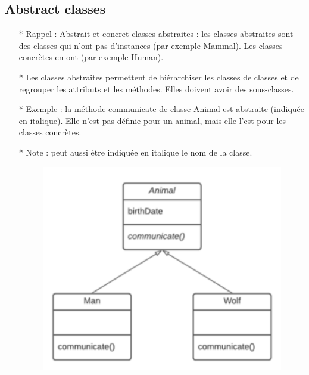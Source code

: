 \documentclass[12pt]{article}
\begin{document}
	\subsection{Abstract classes}
	\begin{itemize}
		\item[* ] Rappel : Abstrait et concret
		classes abstraites : les classes abstraites sont des classes qui
		n'ont pas d'instances (par exemple Mammal).
		Les classes concrètes en ont (par exemple Human).
		\item[* ] Les classes abstraites permettent de hiérarchiser les classes
		de classes et de regrouper les attributs et les
		méthodes. Elles doivent avoir des sous-classes.
		\item[* ] Exemple : la méthode communicate de
		classe Animal est abstraite (indiquée en
		italique). Elle n'est pas définie pour un animal,
		mais elle l'est pour les classes concrètes.
		\item[* ]  Note : peut aussi être indiquée en italique
		le nom de la classe.
			\begin{figure}[!hbtp]
			\centering
			\includegraphics[scale=0.75]{Capture7.PNG}
		\end{figure}
	\end{itemize}
\end{document}
